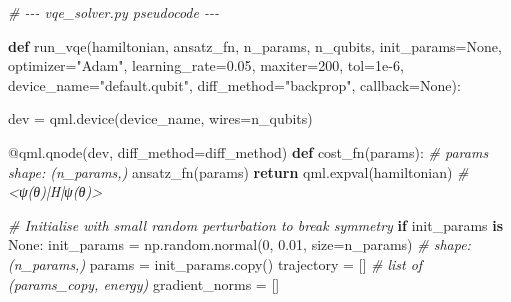 \documentclass[
  11pt,
]{report}
\newenvironment{Shaded}{}{}
\newcommand{\AttributeTok}[1]{\textcolor[rgb]{0.49,0.56,0.16}{#1}}
\newcommand{\CommentTok}[1]{\textcolor[rgb]{0.38,0.63,0.69}{\textit{#1}}}
\newcommand{\ControlFlowTok}[1]{\textcolor[rgb]{0.00,0.44,0.13}{\textbf{#1}}}
\newcommand{\DecValTok}[1]{\textcolor[rgb]{0.25,0.63,0.44}{#1}}
\newcommand{\FloatTok}[1]{\textcolor[rgb]{0.25,0.63,0.44}{#1}}
\newcommand{\KeywordTok}[1]{\textcolor[rgb]{0.00,0.44,0.13}{\textbf{#1}}}
\newcommand{\NormalTok}[1]{#1}
\newcommand{\OperatorTok}[1]{\textcolor[rgb]{0.40,0.40,0.40}{#1}}
\newcommand{\StringTok}[1]{\textcolor[rgb]{0.25,0.44,0.63}{#1}}
\newcommand{\VariableTok}[1]{\textcolor[rgb]{0.10,0.09,0.49}{#1}}
\begin{document}
\begin{Shaded}
\begin{Highlighting}[]
\CommentTok{\# {-}{-}{-} vqe\_solver.py pseudocode {-}{-}{-}}

\KeywordTok{def}\NormalTok{ run\_vqe(hamiltonian, ansatz\_fn, n\_params, n\_qubits,}
\NormalTok{            init\_params}\OperatorTok{=}\VariableTok{None}\NormalTok{, optimizer}\OperatorTok{=}\StringTok{"Adam"}\NormalTok{, learning\_rate}\OperatorTok{=}\FloatTok{0.05}\NormalTok{,}
\NormalTok{            maxiter}\OperatorTok{=}\DecValTok{200}\NormalTok{, tol}\OperatorTok{=}\FloatTok{1e{-}6}\NormalTok{, device\_name}\OperatorTok{=}\StringTok{"default.qubit"}\NormalTok{,}
\NormalTok{            diff\_method}\OperatorTok{=}\StringTok{"backprop"}\NormalTok{, callback}\OperatorTok{=}\VariableTok{None}\NormalTok{):}

\NormalTok{    dev }\OperatorTok{=}\NormalTok{ qml.device(device\_name, wires}\OperatorTok{=}\NormalTok{n\_qubits)}

    \AttributeTok{@qml.qnode}\NormalTok{(dev, diff\_method}\OperatorTok{=}\NormalTok{diff\_method)}
    \KeywordTok{def}\NormalTok{ cost\_fn(params):                    }\CommentTok{\# params shape: (n\_params,)}
\NormalTok{        ansatz\_fn(params)}
        \ControlFlowTok{return}\NormalTok{ qml.expval(hamiltonian)      }\CommentTok{\# \textless{}ψ(θ)|H|ψ(θ)\textgreater{}}

    \CommentTok{\# Initialise with small random perturbation to break symmetry}
    \ControlFlowTok{if}\NormalTok{ init\_params }\KeywordTok{is} \VariableTok{None}\NormalTok{:}
\NormalTok{        init\_params }\OperatorTok{=}\NormalTok{ np.random.normal(}\DecValTok{0}\NormalTok{, }\FloatTok{0.01}\NormalTok{, size}\OperatorTok{=}\NormalTok{n\_params)  }\CommentTok{\# shape: (n\_params,)}
\NormalTok{    params }\OperatorTok{=}\NormalTok{ init\_params.copy()}
\NormalTok{    trajectory }\OperatorTok{=}\NormalTok{ []                         }\CommentTok{\# list of (params\_copy, energy)}
\NormalTok{    gradient\_norms }\OperatorTok{=}\NormalTok{ []}


\end{Highlighting}
\end{Shaded}
\end{document}
